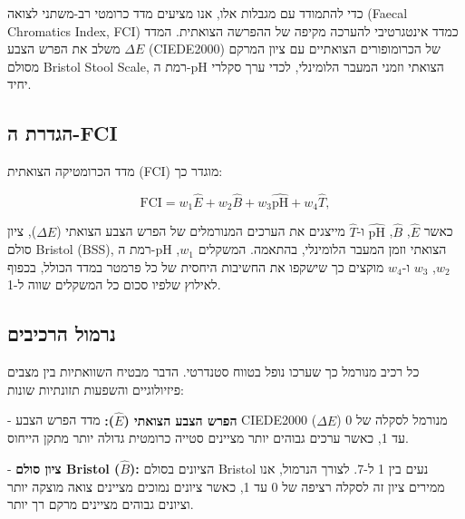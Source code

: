 \begin{hebrew}כדי להתמודד עם מגבלות אלו, אנו מציעים מדד כרומטי רב-משתני לצואה (\textenglish{Faecal Chromatics Index, FCI}) כמדד אינטגרטיבי להערכה מקיפה של ההפרשה הצואתית. המדד משלב את הפרש הצבע $\Delta E$ (\textenglish{CIEDE2000}) של הכרומופורים הצואתיים עם ציון המרקם מסולם \textenglish{Bristol Stool Scale}, רמת ה-\textenglish{pH} הצואתי וזמני המעבר הלומינלי, לכדי ערך סקלרי יחיד.\end{hebrew}

\subsection{\texthebrew{הגדרת ה-\textenglish{FCI}}}

\begin{hebrew}מדד הכרומטיקה הצואתית (\textenglish{FCI}) מוגדר כך:\end{hebrew}

$$\mathrm{FCI} = w_1\hat{E} + w_2\hat{B} + w_3\widehat{\mathrm{pH}} + w_4\hat{T},$$

\begin{hebrew}כאשר $\hat{E}$, $\hat{B}$, $\widehat{\mathrm{pH}}$ ו-$\hat{T}$ מייצגים את הערכים המנורמלים של הפרש הצבע הצואתי ($\Delta E$), ציון סולם \textenglish{Bristol} (\textenglish{BSS}), רמת ה-\textenglish{pH} הצואתי וזמן המעבר הלומינלי, בהתאמה. המשקלים $w_1$, $w_2$, $w_3$ ו-$w_4$ מוקצים כך שישקפו את החשיבות היחסית של כל פרמטר במדד הכולל, בכפוף לאילוץ שלפיו סכום כל המשקלים שווה ל-1.\end{hebrew}

\subsection{\texthebrew{נרמול הרכיבים}}

\begin{hebrew}כל רכיב מנורמל כך שערכו נופל בטווח סטנדרטי. הדבר מבטיח השוואתיות בין מצבים פיזיולוגיים והשפעות תזונתיות שונות:\end{hebrew}

\begin{hebrew}- \textbf{הפרש הצבע הצואתי ($\hat{E}$):} מדד הפרש הצבע \textenglish{CIEDE2000} ($\Delta E$) מנורמל לסקלה של 0 עד 1, כאשר ערכים גבוהים יותר מציינים סטייה כרומטית גדולה יותר מתקן הייחוס.\end{hebrew}

\begin{hebrew}- \textbf{ציון סולם \textenglish{Bristol} ($\hat{B}$):} הציונים בסולם \textenglish{Bristol} נעים בין 1 ל-7. לצורך הנרמול, אנו ממירים ציון זה לסקלה רציפה של 0 עד 1, כאשר ציונים נמוכים מציינים צואה מוצקה יותר וציונים גבוהים מציינים מרקם רך יותר.\end{hebrew}


